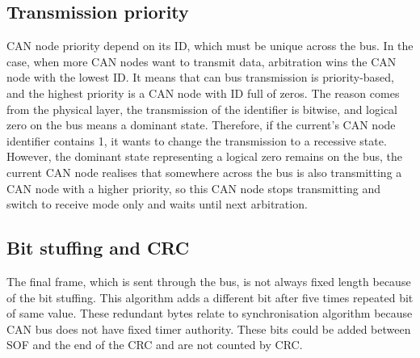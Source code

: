 \documentclass{ctuthesis}
\begin{document}
  \subsection{Transmission priority}
   CAN node priority depend on its ID, which must be unique across the bus. In the case, when more CAN nodes want to transmit data, arbitration wins the CAN node with the lowest ID. It means that can bus transmission is priority-based, and the highest priority is a CAN node with ID full of zeros. The reason comes from the physical layer, the transmission of the identifier is bitwise, and logical zero on the bus means a dominant state. Therefore, if the current's CAN node identifier contains 1, it wants to change the transmission to a recessive state. However, the dominant state representing a logical zero remains on the bus, the current CAN node realises that somewhere across the bus is also transmitting a CAN node with a higher priority, so this CAN node stops transmitting and switch to receive mode only and waits until next arbitration.
  \subsection{Bit stuffing and CRC}
   The final frame, which is sent through the bus, is not always fixed length because of the bit stuffing. This algorithm adds a different bit after five times repeated bit of same value. These redundant bytes relate to synchronisation algorithm because CAN bus does not have fixed timer authority. These bits could be added between SOF and the end of the  CRC and are not counted by CRC\cite{can_crc}.
\end{document}
